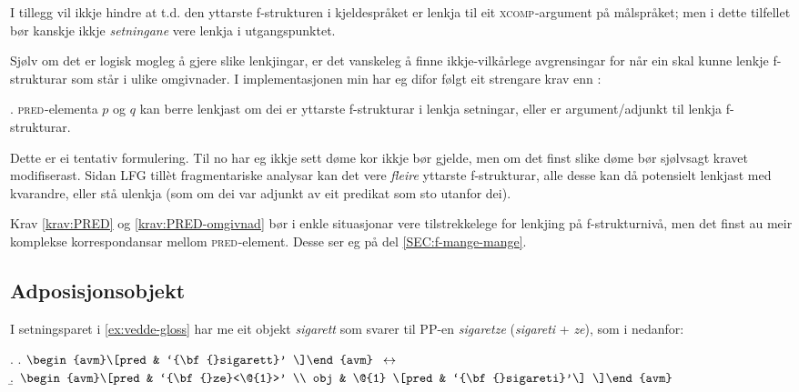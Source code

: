 \documentclass[11pt,a4paper,oneside,draft]{report}
\newcommand{\F}[2]{\textsc{#1}\ensuremath{_{#2}}}
\newcommand{\XCOMP}{\F{xcomp}{}}
\newcommand{\PRED}{\F{pred}{}}
\begin{document}
I tillegg vil ikkje \Last hindre at t.d. den yttarste f-strukturen i
kjeldespråket er lenkja til eit \XCOMP{}-argument på målspråket; men i
dette tilfellet bør kanskje ikkje \emph{setningane} vere lenkja i
utgangspunktet.

Sjølv om det er logisk mogleg å gjere slike lenkjingar, er det
vanskeleg å finne ikkje-vilkårlege avgrensingar for når ein skal kunne
lenkje f-strukturar som står i ulike omgivnader. I implementasjonen
min har eg difor følgt eit strengare krav enn \Last[e]:

\ex. \label{krav:PRED-omgivnad} \PRED{}-elementa $p$ og $q$ kan berre
     lenkjast om dei er yttarste f-strukturar i lenkja setningar, eller
     er argument/adjunkt til lenkja f-strukturar.

Dette er ei tentativ formulering. Til no har eg ikkje sett døme kor
\Last ikkje bør gjelde, men om det finst slike døme bør sjølvsagt
kravet modifiserast. Sidan LFG tillèt fragmentariske analysar kan det
vere \emph{fleire} yttarste f-strukturar, alle desse kan då potensielt
lenkjast med kvarandre, eller stå ulenkja (som om dei var adjunkt av
eit predikat som sto utanfor dei).

Krav \ref{krav:PRED} og \ref{krav:PRED-omgivnad} bør i enkle
situasjonar vere tilstrekkelege for lenkjing på f-strukturnivå, men
det finst au meir komplekse korrespondansar mellom \PRED{}-element. Desse
ser eg på del \ref{SEC:f-mange-mange}.


\subsection{Adposisjonsobjekt}
\label{sec-3.6.4}

\label{SEC:adposisjonsobjekt}

 I setningsparet i \ref{ex:vedde-gloss} har me eit objekt \emph{sigarett}
 som svarer til PP-en \emph{sigaretze} (\emph{sigareti} + \emph{ze}), som i \Next
 nedanfor:

{\avmoptions{}
\ex. \a. $\begin{avm}\[pred & `{\bf{}sigarett}' \]\end{avm}\\$
     $\\\leftrightarrow$\\
     \b.     $\begin{avm}\[pred & `{\bf{}ze}<\@{1}>' \\
                 obj & \@{1} \[pred & `{\bf{}sigareti}'\] \]\end{avm}$

}
\end{document}
